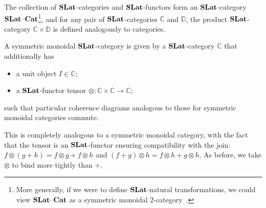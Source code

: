 The collection of $\mathbf{SLat}$-categories and $\mathbf{SLat}$-functors form an $\mathbf{SLat}$-category $\mathbf{SLat}\text{--}\mathbf{Cat}$\footnote{More generally, if we were to define $\mathbf{SLat}$-natural transformations, we could view $\mathbf{SLat}\text{--}\mathbf{Cat}$ as a symmetric monoidal 2-category~\cite{Kelly2022BASICCO}.}, and for any pair of $\mathbf{SLat}$-categories $\mathbb{C}$ and $\mathbb{D}$, the product $\mathbf{SLat}$-category $\mathbb{C} \times \mathbb{D}$ is defined analogously to categories.

\begin{definition}%
	\label{def:enriched-prop}
	A symmetric monoidal $\mathbf{SLat}$-category is given by a $\mathbf{SLat}$-category $\mathbb{C}$ that additionally has
	\begin{itemize}
		\item a unit object $I \in \mathbb{C}$;
		\item a $\mathbf{SLat}$-functor tensor $\otimes\colon \mathbb{C} \times \mathbb{C} \to \mathbb{C}$;
	\end{itemize}
	such that particular coherence diagrams analogous to those for symmetric monoidal categories commute.
\end{definition}
This is completely analogous to a symmetric monoidal category, with the fact that the tensor is an $\mathbf{SLat}$-functor ensuring compatibility with the join: $f \otimes (g+h) = f \otimes g + f \otimes h $ and $ (f+g) \otimes h = f \otimes h + g \otimes h$.
As before, we take $\otimes$ to bind more tightly than $+$.

